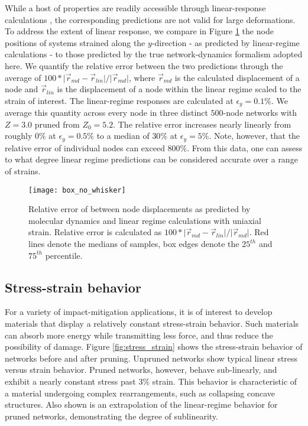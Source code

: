 \documentclass[9pt,twocolumn,twoside]{pnas-new}
\begin{document}
While a host of properties are readily accessible through linear-response calculations \cite{goodrich2015principle,sussman2016spatial}, the corresponding predictions are not valid for large deformations.  To address the extent of linear response, we compare in Figure \ref{fig:linear} the node positions of systems strained along the $y$-direction - as predicted by linear-regime calculations - to those predicted by the true network-dynamics formalism adopted here.  We quantify the relative error between the two predictions through the average of $100 * \lvert \vec{r}_{md}-\vec{r}_{lin} \lvert/\lvert \vec{r}_{md} \lvert$, where $\vec{r}_{md}$ is the calculated displacement of a node and $\vec{r}_{lin}$ is 
the displacement of a node within the linear regime scaled to the strain of interest.  The linear-regime responses are calculated at $\epsilon_{y}=0.1\%$. We average this quantity across every node in three distinct $500$-node networks with $Z=3.0$ pruned from $Z_{0}=5.2$. The relative error increases nearly linearly from roughly $0\%$ at $\epsilon_{y}=0.5 \%$ to a median of $30\%$ at $\epsilon_{y}=5\%$. Note, however, that the relative error of individual nodes can exceed $800\%$.  From this data, one can assess to what degree linear regime predictions can be considered accurate over a range of strains.

\begin{figure}
	\centering
	\texttt{[image: box\_no\_whisker]}
	\caption{Relative error of between node displacements as predicted by molecular dynamics and linear regime calculations with uniaxial strain.  Relative error is calculated as $100 * \lvert \vec{r}_{md} - \vec{r}_{lin} \lvert/\lvert \vec{r}_{md} \lvert$.  Red lines denote the medians of samples, box edges denote the $25^{th}$ and $75^{th}$ percentile.}
	\label{fig:linear}
\end{figure}
\subsection*{Stress-strain behavior}


 For a variety of impact-mitigation applications, it is of interest to develop materials that display a relatively constant stress-strain behavior. Such materials can absorb more energy while transmitting less force, and thus reduce the possibility of damage.  Figure \ref{fig:stress_strain} shows the stress-strain behavior of networks before and after pruning.  Unpruned networks show typical linear stress versus strain behavior.  Pruned networks, however, behave sub-linearly, and exhibit a nearly constant stress past 3$\%$ strain.  This behavior is characteristic of a material undergoing complex rearrangements, such as collapsing concave structures.  Also shown is an extrapolation of the linear-regime behavior for pruned networks, demonstrating the degree of sublinearity.
 
\end{document}
